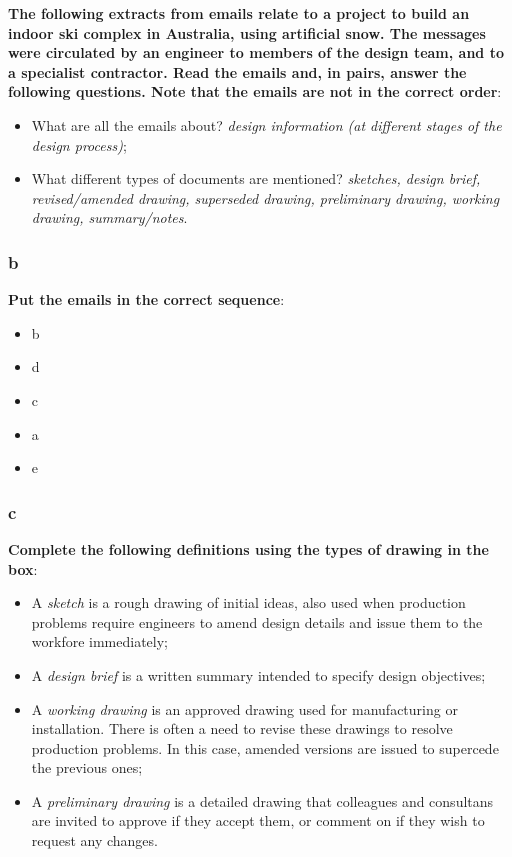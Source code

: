 \textbf{The following extracts from emails relate to a project to build an indoor ski complex in Australia, using artificial snow. The messages were circulated by an engineer to members of the design team, and to a specialist contractor. Read the emails and, in pairs, answer the following questions. Note that the emails are not in the correct order}:

\begin{itemize}

\item What are all the emails about? \textit{design information (at different stages of the design process)};
\item What different types of documents are mentioned?
 \textit{sketches, design brief, revised/amended drawing, superseded drawing, preliminary drawing, working drawing, summary/notes}.
 
\end{itemize}

\subsubsection{b}

\textbf{Put the emails in the correct sequence}:

\begin{itemize}

\item b
\item d
\item c
\item a
\item e

\end{itemize}

\subsubsection{c}

\textbf{Complete the following definitions using the types of drawing in the box}:

\begin{itemize}

\item A \textit{sketch} is a rough drawing of initial ideas, also used when production problems require engineers to amend design details and issue them to the workfore immediately; 
\item A \textit{design brief} is a written summary intended to specify design objectives;
\item A \textit{working drawing} is an approved drawing used for manufacturing or installation. There is often a need to revise these drawings to resolve production problems. In this case, amended versions are issued to supercede the previous ones;
\item A \textit{preliminary drawing} is a detailed drawing that colleagues and consultans are invited to approve if they accept them, or comment on if they wish to request any changes.

\end{itemize}

